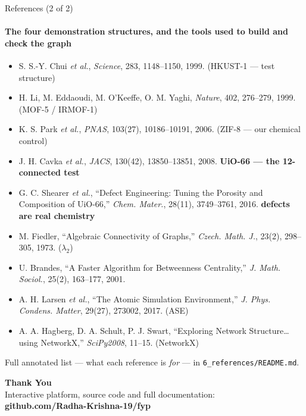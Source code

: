 \documentclass[aspectratio=169, 11pt]{beamer}
\begin{document}
\begin{frame}{References (2 of 2)}
\framesubtitle{The four demonstration structures, and the tools used to build and check the graph}
{\tiny
\begin{itemize}\itemsep2pt
\item[{[11]}] S. S.-Y. Chui \textit{et al.}, \textit{Science}, 283, 1148--1150, 1999.
      \hfill (HKUST-1 --- test structure)
\item[{[12]}] H. Li, M. Eddaoudi, M. O'Keeffe, O. M. Yaghi, \textit{Nature}, 402, 276--279, 1999.
      \hfill (MOF-5 / IRMOF-1)
\item[{[13]}] K. S. Park \textit{et al.}, \textit{PNAS}, 103(27), 10186--10191, 2006.
      \hfill (ZIF-8 --- our chemical control)
\item[{[14]}] J. H. Cavka \textit{et al.}, \textit{JACS}, 130(42), 13850--13851, 2008.
      \hfill \textcolor{coolBlue}{\textbf{UiO-66 --- the 12-connected test}}
\item[{[15]}] G. C. Shearer \textit{et al.}, ``Defect Engineering: Tuning the Porosity and
      Composition of UiO-66,'' \textit{Chem. Mater.}, 28(11), 3749--3761, 2016.
      \hfill \textcolor{coolBlue}{\textbf{defects are real chemistry}}
\item[{[16]}] M. Fiedler, ``Algebraic Connectivity of Graphs,'' \textit{Czech. Math. J.},
      23(2), 298--305, 1973. \hfill ($\lambda_2$)
\item[{[17]}] U. Brandes, ``A Faster Algorithm for Betweenness Centrality,''
      \textit{J. Math. Sociol.}, 25(2), 163--177, 2001.
\item[{[18]}] A. H. Larsen \textit{et al.}, ``The Atomic Simulation Environment,''
      \textit{J. Phys. Condens. Matter}, 29(27), 273002, 2017. \hfill (ASE)
\item[{[19]}] A. A. Hagberg, D. A. Schult, P. J. Swart, ``Exploring Network Structure\ldots
      using NetworkX,'' \textit{SciPy2008}, 11--15. \hfill (NetworkX)
\end{itemize}}
\vspace{0.15cm}
{\scriptsize Full annotated list --- what each reference is \textit{for} --- in
\texttt{6\_references/README.md}.}
\end{frame}

\begin{frame}
\centering
{\Huge \textbf{\textcolor{amritaMaroon}{Thank You}}}\\[0.6cm]
{\footnotesize Interactive platform, source code and full documentation:}\\
{\small \textbf{github.com/Radha-Krishna-19/fyp}}
\end{frame}
\end{document}
